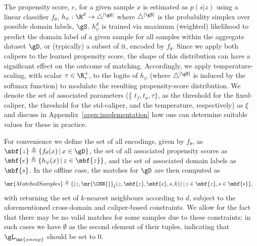 %
The propensity score, $e$, for a given sample $x$ is estimated as $p(s|z)$ using a linear
classifier $f_\theta$, $h_\psi: \R^d \to \bigtriangleup^{|\gS|}$ where $\bigtriangleup^{|\gS|}$ is
the probability simplex over possible domain labels, $\gS$. $h_\psi^d$ is trained via maximum
(weighted) likelihood to predict the domain label of a given sample for all samples within the
aggregate dataset $\gD$, or (typically) a subset of it, encoded by $f_\theta$.
%
Since we apply both calipers to the learned propensity score, the shape of this distribution can
have a significant effect on the outcome of matching.
%
Accordingly, we apply temperature-scaling, with scalar $\tau \in \R^+_\ast$, to the logits of
$h_\psi$ (where $\bigtriangleup^{|\gS|}$ is induced by the softmax function) to modulate the
resulting propensity-score distribution.
%
We denote the set of associated parameters (\{ $t_{f}, t_{\sigma}, \tau \}$, as the threshold for
the fixed-caliper, the threshold for the std-caliper, and the temperature, respectively) as $\xi$
and discuss in Appendix~\ref{appx:implementation} how one can determine suitable values for these
in practice.

For convenience we define the set of all encodings, given by $f_\theta$, as $\mbf{z} \triangleq \{
f_\theta (x)\, |\, x \in \gD \}$, the set of all associated propensity scores as $\mbf{e}
\triangleq \{ h_\psi (x) \, | \, z \in \mbf{z} \}$, and the set of associated domain labels as
$\mbf{s}$.
%
In the offline case, the matches for $\gD$ are then computed as
%
\begin{equation}
  \mr{MatchedSamples} \triangleq \{ (z,  \mr{\CNN{}}_\xi(z, \mbf{z}, \mbf{e}, s, k)) \, | \, z \in
    \mbf{z}, s \in \mbf{s} \},
\end{equation}
%
with \CNN{} returning the set of $k$-nearest neighbours according to $d$, subject to the
aforementioned cross-domain and caliper-based constraints. We allow for the fact that there may be
no valid matches for some samples due to these constraints; in such cases we have $\emptyset$ as
the second element of their tuples, indicating that $\gL_{\mr{unsup}}$ should be set to $0$.
%
